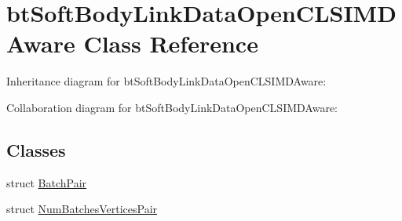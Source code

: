 \hypertarget{classbt_soft_body_link_data_open_c_l_s_i_m_d_aware}{\section{bt\+Soft\+Body\+Link\+Data\+Open\+C\+L\+S\+I\+M\+D\+Aware Class Reference}
\label{classbt_soft_body_link_data_open_c_l_s_i_m_d_aware}
}


Inheritance diagram for bt\+Soft\+Body\+Link\+Data\+Open\+C\+L\+S\+I\+M\+D\+Aware\+:


Collaboration diagram for bt\+Soft\+Body\+Link\+Data\+Open\+C\+L\+S\+I\+M\+D\+Aware\+:
\subsection*{Classes}
\begin{DoxyCompactItemize}
\item 
struct \hyperlink{structbt_soft_body_link_data_open_c_l_s_i_m_d_aware_1_1_batch_pair}{Batch\+Pair}
\item 
struct \hyperlink{structbt_soft_body_link_data_open_c_l_s_i_m_d_aware_1_1_num_batches_vertices_pair}{Num\+Batches\+Vertices\+Pair}
\end{DoxyCompactItemize}

